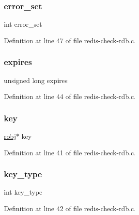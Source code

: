 \subsubsection{\texorpdfstring{error\+\_\+set}{error\_set}}
{\footnotesize\ttfamily int error\+\_\+set}



Definition at line 47 of file redis-\/check-\/rdb.\+c.

\mbox{\label{redis-check-rdb_8c_a014a27f21b0b683e326c20bed7b17e30}} 
\subsubsection{\texorpdfstring{expires}{expires}}
{\footnotesize\ttfamily unsigned long expires}



Definition at line 44 of file redis-\/check-\/rdb.\+c.

\mbox{\label{redis-check-rdb_8c_adc0ee0ed345db513fb6fac27511be4f1}} 
\subsubsection{\texorpdfstring{key}{key}}
{\footnotesize\ttfamily \hyperlink{server_8h_a540f174d2685422fbd7d12e3cd44c8e2}{robj}$\ast$ key}



Definition at line 41 of file redis-\/check-\/rdb.\+c.

\mbox{\label{redis-check-rdb_8c_a2c30e8f426f810c3f53dc75a91e8fc64}} 
\subsubsection{\texorpdfstring{key\+\_\+type}{key\_type}}
{\footnotesize\ttfamily int key\+\_\+type}



Definition at line 42 of file redis-\/check-\/rdb.\+c.

